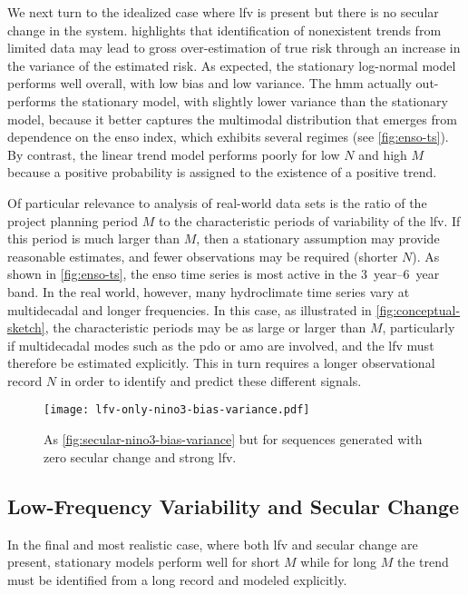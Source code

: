 \documentclass[
  draft,
  linenumbers
]{agujournal2018}
\begin{document}
We next turn to the idealized case where  \gls{lfv} is present but there is no secular change in the system.
 highlights that identification of nonexistent trends from limited data may lead to gross over-estimation of true risk through an increase in the variance of the estimated risk.
As expected, the stationary log-normal model performs well overall, with low bias and low variance.
The \gls{hmm} actually out-performs the stationary model, with slightly lower variance than the stationary model, because it better captures the multimodal distribution that emerges from dependence on the \gls{enso} index, which exhibits several regimes (see \cref{fig:enso-ts}).
By contrast, the linear trend model performs poorly for low $N$ and high $M$ because a positive probability is assigned to the existence of a positive trend.

Of particular relevance to analysis of real-world data sets is the ratio of the project planning period $M$ to the characteristic periods of variability of the \gls{lfv}.
If this period is much larger than $M$, then a stationary assumption may provide reasonable estimates, and fewer observations may be required (shorter $N$).
As shown in \cref{fig:enso-ts}, the \gls{enso} time series is most active in the \SIrange{3}{6}{year} band.
In the real world, however, many hydroclimate time series vary at multidecadal and longer frequencies.
In this case, as illustrated in \cref{fig:conceptual-sketch}, the characteristic periods may be as large or larger than $M$, particularly if multidecadal modes such as the \gls{pdo} or \gls{amo} are involved, and the \gls{lfv} must therefore be estimated explicitly.
This in turn requires a longer observational record $N$ in order to identify and predict these different signals.

\begin{figure}
  \centering
  \texttt{[image: lfv-only-nino3-bias-variance.pdf]}
  \caption{
    As \cref{fig:secular-nino3-bias-variance} but for sequences generated with zero secular change and strong \gls{lfv}.
  }\label{fig:lfv-nino3-bias-variance}
\end{figure}

\subsection{Low-Frequency Variability and Secular Change}

In the final and most realistic case, where both \gls{lfv} and secular change are present, stationary models perform well for short $M$ while for long $M$ the trend must be identified from a long record and modeled explicitly.
\end{document}
